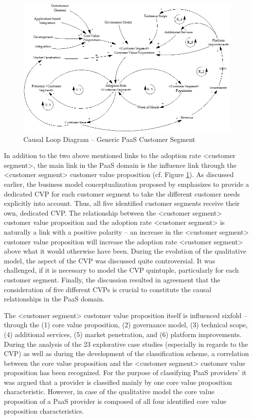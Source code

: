 \begin{figure}[tb]
	\centering
	\includegraphics[width=\textwidth]{gfx/cld_customerSegment}
	\caption{Causal Loop Diagram -- Generic PaaS Customer Segment}
	\label{fig:cld_cs}
\end{figure}

In addition to the two above mentioned links to the adoption rate <customer segment>, the main link in the \ac{PaaS} domain is the influence link through the <customer segment> customer value proposition (cf. Figure \ref{fig:cld_cs}). As discussed earlier, the business model conceptualization proposed by \citet{Johnson2008} emphasizes to provide a dedicated \ac{CVP} for each customer segment to take the different customer needs explicitly into account. Thus, all five identified customer segments receive their own, dedicated \ac{CVP}. The relationship between the <customer segment> customer value proposition and the adoption rate <customer segment> is naturally a link with a positive polarity -- an increase in the <customer segment> customer value proposition will increase the adoption rate <customer segment> above what it would otherwise have been. During the evolution of the qualitative model, the aspect of the \ac{CVP} was discussed quite controversial. It was challenged, if it is necessary to model the \ac{CVP} quintuple, particularly for each customer segment. Finally, the discussion resulted in agreement that the consideration of five different \acp{CVP} is crucial to constitute the causal relationships in the \ac{PaaS} domain.

The <customer segment> customer value proposition itself is influenced sixfold -- through the (1) core value proposition, (2) governance model, (3) technical scope, (4) additional services, (5) market penetration, and (6) platform improvements. During the analysis of the 23 explorative case studies (especially in regards to the \ac{CVP}) as well as during the development of the classification scheme, a correlation between the core value proposition and the <customer segment> customer value proposition has been recognized. For the purpose of classifying \ac{PaaS} providers' it was argued that a provider is classified mainly by one core value proposition characteristic. However, in case of the qualitative model the core value proposition of a \ac{PaaS} provider is composed of all four identified core value proposition characteristics.

